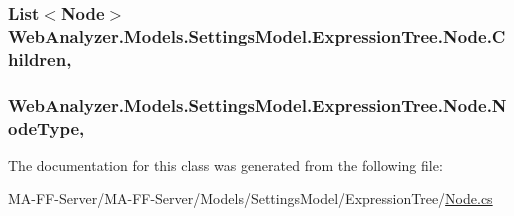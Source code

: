 \subsubsection[{Children}]{\setlength{\rightskip}{0pt plus 5cm}List$<${\bf Node}$>$ Web\+Analyzer.\+Models.\+Settings\+Model.\+Expression\+Tree.\+Node.\+Children\hspace{0.3cm}{\ttfamily [get]}, {\ttfamily [set]}}\label{class_web_analyzer_1_1_models_1_1_settings_model_1_1_expression_tree_1_1_node_af97835cf31c19c83f0044bbd6f4a9e91}
\hypertarget{class_web_analyzer_1_1_models_1_1_settings_model_1_1_expression_tree_1_1_node_a326bab10d73a525224fcf5b061491dda}{}
\subsubsection[{Node\+Type}]{ Web\+Analyzer.\+Models.\+Settings\+Model.\+Expression\+Tree.\+Node.\+Node\+Type\hspace{0.3cm}{\ttfamily [get]}, {\ttfamily [set]}}\label{class_web_analyzer_1_1_models_1_1_settings_model_1_1_expression_tree_1_1_node_a326bab10d73a525224fcf5b061491dda}


The documentation for this class was generated from the following file\+:\begin{DoxyCompactItemize}
\item 
M\+A-\/\+F\+F-\/\+Server/\+M\+A-\/\+F\+F-\/\+Server/\+Models/\+Settings\+Model/\+Expression\+Tree/\hyperlink{_node_8cs}{Node.\+cs}\end{DoxyCompactItemize}
